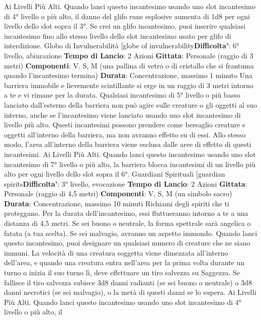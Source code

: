 \begin{multicols}{2}
Ai Livelli Più Alti. Quando lanci questo incantesimo
usando uno slot incantesimo di 4° livello o più alto, il
danno del glifo rune esplosive aumenta di 1d8 per ogni
livello dello slot sopra il 3°. Se crei un glifo incantesimo,
puoi inserire qualsiasi incantesimo fino allo stesso
livello dello slot incantesimo usato per glifo di
interdizione.
Globo di Invulnerabilità
[globe of invulnerability\textbf{Difficolta'}:
6° livello, abiurazione
\textbf{Tempo di Lancio}: 2 Azioni
\textbf{Gittata}: Personale (raggio di 3 metri)
\textbf{Componenti}: V. S, M (una pallina di vetro o di cristallo
che si frantuma quando l’incantesimo termina)
\textbf{Durata}: Concentrazione, massimo 1 minuto
Una barriera immobile e lievemente scintillante si erge
in un raggio di 3 metri intorno a te e vi rimane per la
durata.
Qualsiasi incantesimo di 5° livello o più basso lanciato
dall’esterno della barriera non può agire sulle creature o
gli oggetti al suo interno, anche se l’incantesimo viene
lanciato usando uno slot incantesimo di livello più alto.
Questi incantesimi possono prendere come bersaglio
creature e oggetti all’interno della barriera, ma non
avranno effetto su di essi. Allo stesso modo, l’area
all’interno della barriera viene esclusa dalle aree di
effetto di questi incantesimi.
Ai Livelli Più Alti. Quando lanci questo incantesimo
usando uno slot incantesimo di 7° livello o più alto, la
barriera blocca incantesimi di un livello più alto per ogni
livello dello slot sopra il 6°.
Guardiani Spirituali
[guardian spirits\textbf{Difficolta'}:
3° livello, evocazione
\textbf{Tempo di Lancio}: 2 Azioni
\textbf{Gittata}: Personale (raggio di 4,5 metri)
\textbf{Componenti}: V, S, M (un simbolo sacro)
\textbf{Durata}: Concentrazione, massimo 10 minuti
Richiami degli spiriti che ti proteggano. Per la durata
dell’incantesimo, essi fluttueranno intorno a te a una
distanza di 4,5 metri. Se sei buono o neutrale, la forma
spettrale sarà angelica o fatata (a tua scelta). Se sei
malvagio, avranno un aspetto immondo.
Quando lanci questo incantesimo, puoi designare un
qualsiasi numero di creature che ne siano immuni. La
velocità di una creatura soggetta viene dimezzata
all’interno dell’area, e quando una creatura entra
nell’area per la prima volta durante un turno o inizia il
suo turno lì, deve effettuare un tiro salvezza su
Saggezza. Se fallisce il tiro salvezza subisce 3d8 danni
radianti (se sei buono o neutrale) o 3d8 danni necrotici
(se sei malvagio), o la metà di questi danni se lo
supera.
Ai Livelli Più Alti. Quando lanci questo incantesimo
usando uno slot incantesimo di 4° livello o più alto, il

\end{multicols}
